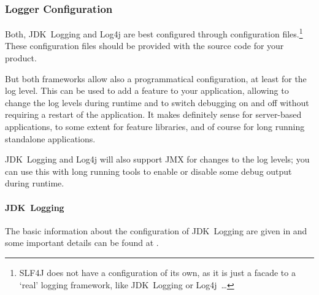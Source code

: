 
\subsubsection{Logger Configuration}\label{sec:LoggerConfiguration}
Both, JDK~Logging and Log4j are best configured through configuration files.\footnote{SLF4J does not have a configuration of its own, as it is just a facade to a ‘real’ logging framework, like JDK~Logging or Log4j~…} These configuration files should be provided with the source code for your product.

But both frameworks allow also a programmatical configuration, at least for the log level. This can be used to add a feature to your application, allowing to change the log levels during runtime and to switch debugging on and off without requiring a restart of the application. It makes definitely sense for server-based applications, to some extent for feature libraries, and of course for long running standalone applications.

JDK~Logging and Log4j will also support JMX for changes to the log levels\autocite{ORACLE_DOC_LOGGINGMXBEAN_INTERFACE, APACHE_LOG4J:JMX}; you can use this with long running tools to enable or disable some debug output during runtime.


\paragraph{JDK~Logging} The basic information about the configuration of JDK~Logging are given in \autocite{ORACLE_DOC_LOGGING_OVERVIEW:ConfigurationFile, ORACLE_DOC_LOGGING_OVERVIEW:DefaultConfiguration} and some important details can be found at \autocite{ORACLE_DOC_LOGMANAGER_CLASS}.

